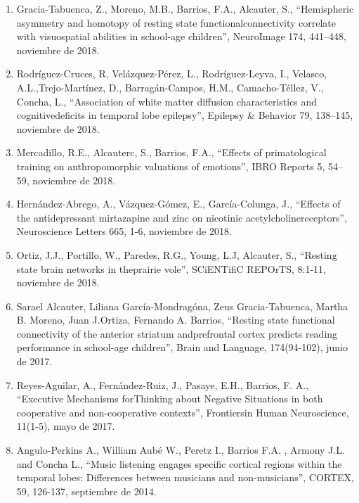 \begin{enumerate}
\item Gracia-Tabuenca, Z., Moreno, M.B., Barrios, F.A., Alcauter, S., “Hemispheric asymmetry and homotopy of resting state 
functionalconnectivity 
correlate with visuospatial abilities in school-age children”, NeuroImage 174, 441–448, noviembre de 2018.

\item Rodríguez-Cruces, R, Velázquez-Pérez, L., Rodríguez-Leyva, I., Velasco, A.L.,Trejo-Martínez, D., Barragán-Campos, H.M., Camacho-Téllez, 
V., 
Concha, L., “Association of white matter diffusion characteristics and cognitivedeficits in temporal lobe epilepsy”, Epilepsy \& Behavior 79, 
138–145, noviembre de 2018.

\item Mercadillo, R.E., Alcauterc, S., Barrios, F.A., “Effects of primatological training on anthropomorphic valuations of emotions”, IBRO 
Reports 
5, 54–59, noviembre de 2018.

\item Hernández-Abrego, A., Vázquez-Gómez, E., García-Colunga, J., “Effects of the antidepressant mirtazapine and zinc on nicotinic 
acetylcholinereceptors”, Neuroscience Letters 665, 1-6, noviembre de 2018.

\item Ortiz, J.J., Portillo, W., Paredes, R.G., Young, L.J, Alcauter, S., “Resting state brain networks in theprairie vole”, SCiENTifiC 
REPOrTS, 
8:1-11, noviembre de 2018.

\item Sarael Alcauter, Liliana García-Mondragóna, Zeus Gracia-Tabuenca, Martha B. Moreno, Juan J.Ortiza, Fernando A. Barrios, “Resting state 
functional connectivity of the anterior striatum andprefrontal cortex predicts reading performance in school-age children”, Brain and 
Language, 174(94-102), junio de 2017.

\item Reyes-Aguilar, A., Fernández-Ruiz, J., Pasaye, E.H., Barrios, F. A., “Executive Mechanisms forThinking about Negative Situations in 
both 
cooperative and non-cooperative contexts”, Frontiersin Human Neuroscience, 11(1-5), mayo de 2017.

\item Angulo-Perkins A., William Aubé W., Peretz I., Barrios F.A. , Armony J.L. and Concha L., “Music listening engages specific cortical 
regions 
within the temporal lobes: Differences between musicians and non-musicians”, CORTEX, 59, 126-137, septiembre de 2014.


\end{enumerate}
